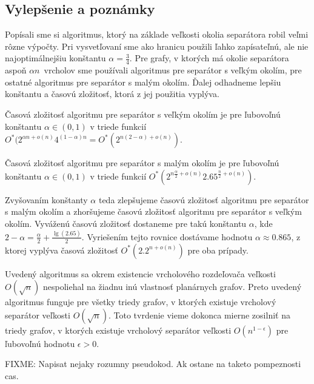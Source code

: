 \subsection{Vylepšenie a poznámky}

Popísali sme si algoritmus, ktorý na základe veľkosti okolia separátora robil veľmi rôzne výpočty.
Pri vysvetľovaní sme ako hranicu použili ľahko zapísateľnú, ale nie najoptimálnejšiu konštantu
$\alpha = \frac{3}{4}$. Pre grafy, v ktorých má okolie separátora aspoň $\alpha n$ vrcholov
sme používali algoritmus pre separátor s veľkým okolím, pre ostatné algoritmus pre separátor
s malým okolím. Ďalej odhadneme lepšiu konštantu a časovú zložitosť, ktorá z jej použitia vyplýva.

Časová zložitosť algoritmu pre separátor s veľkým okolím je pre ľubovoľnú konštantu $\alpha \in (0, 1)$
v triede funkcií $O^*(2^{\alpha n + o(n)}4^{(1 - \alpha) n} = O^*(2^{n(2 - \alpha) + o(n)})$.

Časová zložitosť algoritmu pre separátor s malým okolím je pre ľubovoľnú konštantu $\alpha \in (0,1)$
v triede funkcií $O^*(2^{n\frac{\alpha}{2} + o(n)} 2.65^{\frac{n}{2} + o(n)})$.

Zvyšovaním konštanty $\alpha$ teda zlepšujeme časovú zložitosť algoritmu pre separátor s malým
okolím a zhoršujeme časovú zložitosť algoritmu pre separátor s veľkým okolím. Vyváženú časovú
zložitosť dostaneme pre takú konštantu $\alpha$, kde $2 - \alpha = \frac{\alpha}{2} + \frac{\lg(2.65)}{2}$.
Vyriešením tejto rovnice dostávame hodnotu $\alpha \approx 0.865$, z ktorej vyplýva časová zložitosť
$O^*(2.2^{n + o(n)})$ pre oba prípady.

Uvedený algoritmus sa okrem existencie vrcholového rozdeľovača veľkosti $O(\sqrt{n})$ nespoliehal
na žiadnu inú vlastnosť planárnych grafov. Preto uvedený algoritmus funguje pre všetky triedy grafov,
v ktorých existuje vrcholový separátor veľkosti $O(\sqrt{n})$. Toto tvrdenie vieme dokonca mierne
zosilniť na triedy grafov, v ktorých existuje vrcholový separátor veľkosti $O(n^{1 - \epsilon})$ pre
ľubovoľnú hodnotu $\epsilon > 0$.

FIXME: Napisat nejaky rozumny pseudokod. Ak ostane na taketo pompeznosti cas.
